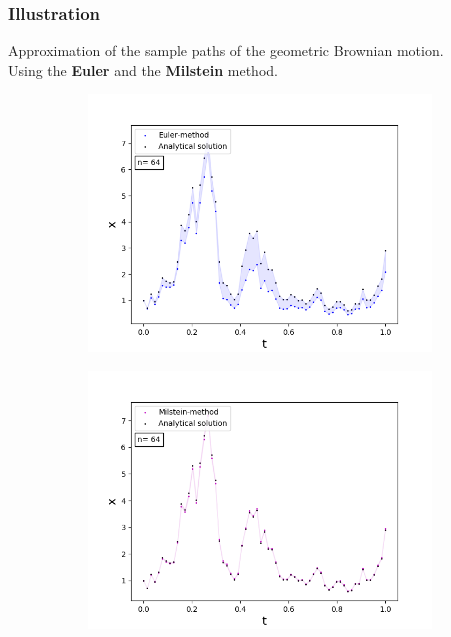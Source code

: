 \begin{frame}
\frametitle{Illustration}
Approximation of the sample paths of the geometric Brownian motion.\\
Using the \textbf{Euler} and the \textbf{Milstein} method.
\begin{figure}[!h]
\centering
   \begin{subfigure}{0.49\linewidth} \centering
     \includegraphics[scale=0.35]{Content/Graphics/SDE_EulerGBM_n_64}
   \end{subfigure}
   \begin{subfigure}{0.49\linewidth} \centering
     \includegraphics[scale=0.35]{Content/Graphics/SDE_MilsteinGBM_n_64}
   \end{subfigure}
\end{figure}

\end{frame}



